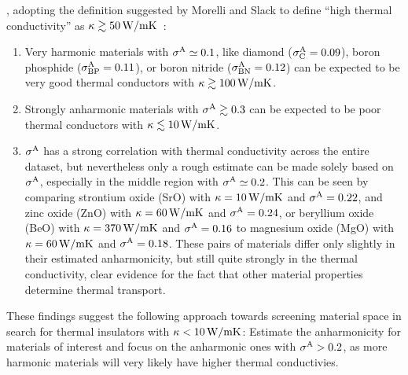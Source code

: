 , adopting the definition suggested by Morelli and Slack to define ``high thermal conductivity'' as $\kappa \gtrsim 50 \, {\rm W/mK}$~\cite{Morelli.2006}:
\begin{enumerate}
	\item Very harmonic materials with $\sigma^\mathrm{A} \simeq 0.1$, like diamond ($\sigma^\mathrm{A}_{\rm C} = 0.09$), boron phosphide ($\sigma^\mathrm{A}_{\rm BP} = 0.11$), or boron nitride ($\sigma^\mathrm{A}_{\rm BN} = 0.12$) can be expected to be very good thermal conductors with $\kappa \gtrsim 100\,{\rm W/mK}$.
	\item Strongly anharmonic materials with $\sigma^\mathrm{A} \gtrsim 0.3$ can be expected to be poor thermal conductors with $\kappa \lesssim 10\,{\rm W/mK}$.
	\item $\sigma^\mathrm{A}$ has a strong correlation with thermal conductivity across the entire dataset, but nevertheless only a rough estimate can be made solely based on $\sigma^\mathrm{A}$, especially in the middle region with $\sigma^\mathrm{A} \simeq 0.2$. This can be seen by comparing strontium oxide (SrO) with $\kappa = 10\,{\rm W/mK}$ and $\sigma^\mathrm{A} = 0.22$, and zinc oxide (ZnO) with $\kappa = 60\,{\rm W/mK}$ and $\sigma^\mathrm{A} = 0.24$, or beryllium oxide (BeO) with $\kappa = 370\,{\rm W/mK}$ and $\sigma^\mathrm{A} = 0.16$ to magnesium oxide (MgO) with $\kappa = 60\,{\rm W/mK}$ and $\sigma^\mathrm{A} = 0.18$. These pairs of materials differ only slightly in their estimated anharmonicity, but still quite strongly in the thermal conductivity, clear evidence for the fact that other material properties determine thermal transport. 
\end{enumerate}

{These findings suggest the following approach} towards screening material space in search for thermal insulators with $\kappa < 10\,{\rm W/mK}$: Estimate the anharmonicity for materials of interest and focus on the anharmonic ones with $\sigma^\mathrm{A} > 0.2$, as more harmonic materials will very likely have higher thermal conductivies.

